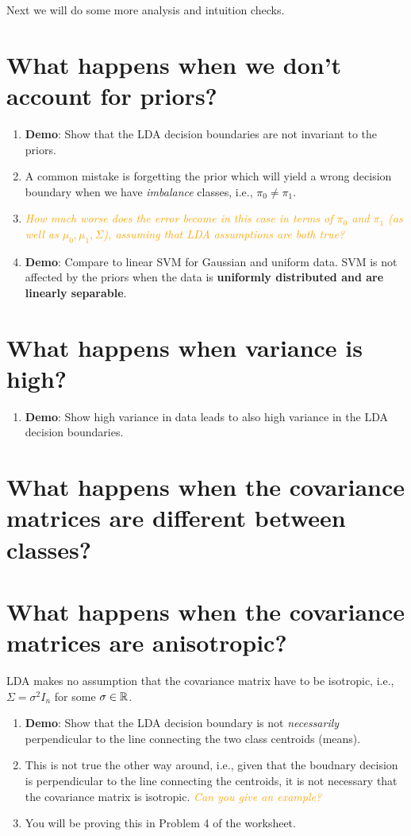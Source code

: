 \documentclass[letterpaper,12pt]{article}
\theoremstyle{plain}
\theoremstyle{definition}
\theoremstyle{remark}
\newcommand{\question}[1]{\textcolor{orange}{\textit{#1}}}
\begin{document}
Next we will do some more analysis and intuition checks.

\section{What happens when we don't account for priors?}

\begin{enumerate}
    \item \textbf{Demo}: Show that the LDA decision boundaries are not invariant to the priors.
    \item A common mistake is forgetting the prior which will yield a wrong decision boundary when we have \emph{imbalance} classes, i.e., $\pi_0 \ne \pi_1$.
    \item \question{How much worse does the error become in this case in terms of $\pi_0$ and $\pi_1$ (as well as $\mu_0, \mu_1, \Sigma$), assuming that LDA assumptions are both true?}
    \item \textbf{Demo}: Compare to linear SVM for Gaussian and uniform data. SVM is not affected by the priors when the data is \textbf{uniformly distributed and are linearly separable}.
\end{enumerate}

\section{What happens when variance is high?}

\begin{enumerate}
    \item \textbf{Demo}: Show high variance in data leads to also high variance in the LDA decision boundaries.
\end{enumerate}

\section{What happens when the covariance matrices are different between classes?}

\section{What happens when the covariance matrices are anisotropic?}

LDA makes no assumption that the covariance matrix have to be isotropic, i.e., $\Sigma = \sigma^2 I_n$ for some $\sigma \in \mathbb{R}$.

\begin{enumerate}
    \item \textbf{Demo}: Show that the LDA decision boundary is not \emph{necessarily} perpendicular to the line connecting the two class centroids (means).
    \item This is not true the other way around, i.e., given that the boudnary decision is perpendicular to the line connecting the centroids, it is not necessary that the covariance matrix is isotropic. \question{Can you give an example?}
    \item You will be proving this in Problem 4 of the worksheet.
\end{enumerate}
\end{document}

